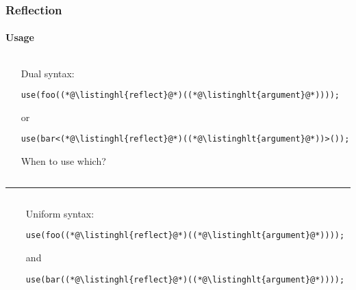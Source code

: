 \documentclass[compress,table,xcolor=table]{beamer}
\begin{document}
\begin{frame}[fragile]
  \frametitle{Reflection}
  \framesubtitle{Usage}
  \begin{columns}
    \begin{column}{.05\textwidth}
    \end{column}
    \begin{column}{.85\textwidth}
    \normalsize
    Dual syntax:
    \begin{lstlisting}[language=c++2x,basicstyle=\normalsize\ttfamily]
use(foo((*@\listinghl{reflect}@*)((*@\listinghlt{argument}@*))));
    \end{lstlisting}
    or
    \begin{lstlisting}[language=c++2x,basicstyle=\normalsize\ttfamily]
use(bar<(*@\listinghl{reflect}@*)((*@\listinghlt{argument}@*))>());
    \end{lstlisting}
    When to use which?
    \end{column}
  \end{columns}
  \vfill
  \hrule
  \vfill
  \begin{columns}
    \begin{column}{.05\textwidth}
    \end{column}
    \begin{column}{.85\textwidth}
    \normalsize
    Uniform syntax:
    \begin{lstlisting}[language=c++2x,basicstyle=\normalsize\ttfamily]
use(foo((*@\listinghl{reflect}@*)((*@\listinghlt{argument}@*))));
    \end{lstlisting}
    and
    \begin{lstlisting}[language=c++2x,basicstyle=\normalsize\ttfamily]
use(bar((*@\listinghl{reflect}@*)((*@\listinghlt{argument}@*))));
    \end{lstlisting}
    \end{column}
  \end{columns}
\end{frame}
\end{document}
